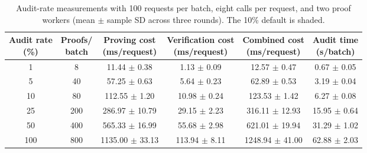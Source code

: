 \begin{table}[!t]
\centering
\caption{Audit-rate measurements with 100 requests per batch, eight calls per request, and two proof workers (mean $\pm$ sample SD across three rounds). The 10\% default is shaded.}
\label{tab:c3-audit-rate}
\footnotesize
\renewcommand{\arraystretch}{1.08}
\begin{tabular*}{\textwidth}{@{\hspace{3pt}}c@{\extracolsep{\fill}}ccccc@{\hspace{3pt}}}
\toprule
\shortstack{\textbf{Audit rate}\\\textbf{(\%)}} & \shortstack{\textbf{Proofs/}\\\textbf{batch}} & \shortstack{\textbf{Proving cost}\\\textbf{(ms/request)}} & \shortstack{\textbf{Verification cost}\\\textbf{(ms/request)}} & \shortstack{\textbf{Combined cost}\\\textbf{(ms/request)}} & \shortstack{\textbf{Audit time}\\\textbf{(s/batch)}} \\
\midrule
1 & 8 & 11.44 $\pm$ 0.38 & 1.13 $\pm$ 0.09 & 12.57 $\pm$ 0.47 & 0.67 $\pm$ 0.05 \\
5 & 40 & 57.25 $\pm$ 0.63 & 5.64 $\pm$ 0.23 & 62.89 $\pm$ 0.53 & 3.19 $\pm$ 0.04 \\
\rowcolor{gray!12}
10 & 80 & 112.55 $\pm$ 1.20 & 10.98 $\pm$ 0.24 & 123.53 $\pm$ 1.42 & 6.27 $\pm$ 0.08 \\
25 & 200 & 286.97 $\pm$ 10.79 & 29.15 $\pm$ 2.23 & 316.11 $\pm$ 12.93 & 15.95 $\pm$ 0.64 \\
50 & 400 & 565.33 $\pm$ 16.99 & 55.68 $\pm$ 2.98 & 621.01 $\pm$ 19.94 & 31.29 $\pm$ 1.02 \\
100 & 800 & 1135.00 $\pm$ 33.13 & 113.94 $\pm$ 8.11 & 1248.94 $\pm$ 41.00 & 62.88 $\pm$ 2.03 \\
\bottomrule
\end{tabular*}
\end{table}

